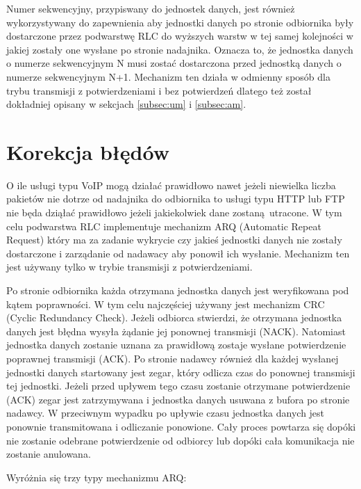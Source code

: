 Numer sekwencyjny, przypiswany do jednostek danych, jest również wykorzystywany do zapewnienia aby jednostki danych po stronie odbiornika były dostarczone przez podwarstwę RLC do wyższych warstw w tej samej kolejności w jakiej zostały one wysłane po stronie nadajnika. Oznacza to, że jednostka danych o numerze sekwencyjnym N musi zostać dostarczona przed jednostką danych o numerze sekwencyjnym N+1. Mechanizm ten działa w odmienny sposób dla trybu transmisji z potwierdzeniami i bez potwierdzeń dlatego też został dokładniej opisany w sekcjach \ref{subsec:um} i \ref{subsec:am}.

\section{Korekcja błędów}

O ile usługi typu VoIP mogą działać prawidłowo nawet jeżeli niewielka liczba pakietów nie dotrze od nadajnika do odbiornika to usługi typu HTTP lub FTP nie będa dziąłać prawidłowo jeżeli jakiekolwiek dane zostaną utracone. W tym celu podwarstwa RLC implementuje mechanizm ARQ (Automatic Repeat Request) który ma za zadanie wykrycie czy jakieś jednostki danych nie zostały dostarczone i zarządanie od nadawacy aby ponowił ich wysłanie. Mechanizm ten jest używany tylko w trybie transmisji z potwierdzeniami.

Po stronie odbiornika każda otrzymana jednostka danych jest weryfikowana pod kątem poprawności. W tym celu najczęściej używany jest mechanizm CRC (Cyclic Redundancy Check). Jeżeli odbiorca stwierdzi, że otrzymana jednostka danych jest błędna wysyła żądanie jej ponownej transmisji (NACK). Natomiast jednostka danych zostanie uznana za prawidłową zostaje wysłane potwierdzenie poprawnej transmisji (ACK). Po stronie nadawcy również dla każdej wysłanej jednostki danych startowany jest zegar, który odlicza czas do ponownej transmisji tej jednostki. Jeżeli przed upływem tego czasu zostanie otrzymane potwierdzenie (ACK) zegar jest zatrzymywana i jednostka danych usuwana z bufora po stronie nadawcy. W przeciwnym wypadku po upływie czasu jednostka danych jest ponownie transmitowana i odliczanie ponowione. Cały proces powtarza się dopóki nie zostanie odebrane potwierdzenie od odbiorcy lub dopóki cała komunikacja nie zostanie anulowana.


Wyróżnia się trzy typy mechanizmu ARQ:

